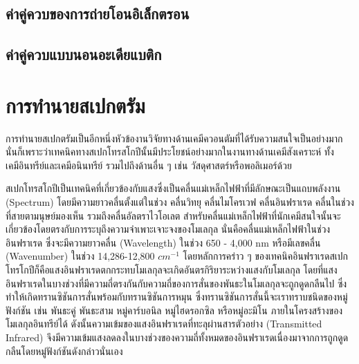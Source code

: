 \subsection{ค่าคู่ควบของการถ่ายโอนอิเล็กตรอน}
\label{ssec:pred_etran_coupling}



\subsection{ค่าคู่ควบแบบนอนอะเดียแบติก}
\label{ssec:nonadia_coupling}



\section{การทำนายสเปกตรัม}
\label{sec:pred_spectra}

การทำนายสเปกตรัมเป็นอีกหนึ่งหัวข้องานวิจัยทางด้านเคมีควอนตัมที่ได้รับความสนใจเป็นอย่างมากนั่นก็เพราะว่าเทคนิคทางสเปกโทรสโกปีนั้นมีประโยชน์อย่างมากในงานทางด้านเคมีสังเคราะห์ ทั้งเคมีอินทรีย์และเคมีอนินทรีย์ รวมไปถึงด้านอื่น ๆ เช่น วัสดุศาสตร์หรือพอลิเมอร์ด้วย

สเปกโทรสโกปีเป็นเทคนิคที่เกี่ยวข้องกับแสงซึ่งเป็นคลื่นแม่เหล็กไฟฟ้าที่มีลักษณะเป็นแถบพลังงาน (Spectrum) โดยมีความยาวคลื่นตั้งแต่ในช่วง คลื่นวิทยุ คลื่นไมโครเวฟ คลื่นอินฟราเรด คลื่นในช่วงที่สายตามนุษย์มองเห็น รวมถึงคลื่นอัลตราไวโอเลต สำหรับคลื่นแม่เหล็กไฟฟ้าที่นักเคมีสนใจนั้นจะเกี่ยวข้องโดยตรงกับการระบุถึงความจำเพาะเจาะจงของโมเลกุล นั่นคือคลื่นแม่เหล็กไฟฟ้าในช่วงอินฟราเรด ซึ่งจะมีความยาวคลื่น (Wavelength) ในช่วง 650 - 4,000 nm หรือมีเลขคลื่น (Wavenumber) ในช่วง 14,286-12,800 $cm^{-1}$ โดยหลักการคร่าว ๆ ของเทคนิคอินฟราเรดสเปกโทรโกปีก็คือแสงอินฟราเรดตกกระทบโมเลกุลจะเกิดอันตรกิริยาระหว่างแสงกับโมเลกุล โดยที่แสงอินฟราเรดในบางช่วงที่มีความถี่ตรงกันกับความถี่ของการสั่นของพันธะในโมเลกุลจะถูกดูดกลืนไป ซึ่งทำให้เกิดทรานซิชันการสั่นพร้อมกับทรานซิชันการหมุน ซึ่งทรานซิชันการสั่นนี้จะเราทราบชนิดของหมู่ฟังก์ชัน เช่น พันธะคู่ พันธะสาม หมู่คาร์บอนิล หมู่ไฮดรอกซิล หรือหมู่อะมิโน ภายในโครงสร้างของโมเลกุลอินทรีย์ได้ ดังนั้นความเข้มของแสงอินฟราเรดที่ทะลุผ่านสารตัวอย่าง (Transmitted Infrared) จึงมีความเข้มแสงลดลงในบางช่วงของความถี่ทั้งหมดของอินฟราเรดเนื่องมาจากการถูกดูดกลืนโดยหมู่ฟังก์ชันดังกล่าวนั่นเอง

